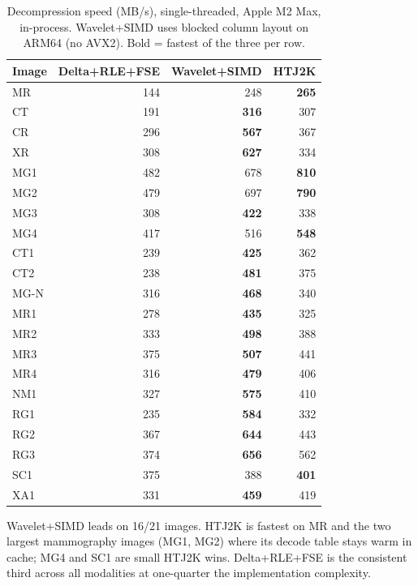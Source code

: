 \documentclass[10pt,twocolumn]{article}
\begin{document}
\begin{table}[h]
  \centering
  \caption{Decompression speed (MB/s), single-threaded, Apple M2 Max, in-process. Wavelet+SIMD uses blocked column layout on ARM64 (no AVX2). Bold = fastest of the three per row.}
  \label{tab:waveletspeed}
  \small
  \setlength{\tabcolsep}{4pt}
  \begin{tabular}{lrrr}
    \toprule
    Image & Delta+RLE+FSE & Wavelet+SIMD & HTJ2K \\
    \midrule
    MR   & 144 & 248 & \textbf{265} \\
    CT   & 191 & \textbf{316} & 307 \\
    CR   & 296 & \textbf{567} & 367 \\
    XR   & 308 & \textbf{627} & 334 \\
    MG1  & 482 & 678 & \textbf{810} \\
    MG2  & 479 & 697 & \textbf{790} \\
    MG3  & 308 & \textbf{422} & 338 \\
    MG4  & 417 & 516 & \textbf{548} \\
    CT1  & 239 & \textbf{425} & 362 \\
    CT2  & 238 & \textbf{481} & 375 \\
    MG-N & 316 & \textbf{468} & 340 \\
    MR1  & 278 & \textbf{435} & 325 \\
    MR2  & 333 & \textbf{498} & 388 \\
    MR3  & 375 & \textbf{507} & 441 \\
    MR4  & 316 & \textbf{479} & 406 \\
    NM1  & 327 & \textbf{575} & 410 \\
    RG1  & 235 & \textbf{584} & 332 \\
    RG2  & 367 & \textbf{644} & 443 \\
    RG3  & 374 & \textbf{656} & 562 \\
    SC1  & 375 & 388 & \textbf{401} \\
    XA1  & 331 & \textbf{459} & 419 \\
    \bottomrule
  \end{tabular}
\end{table}

Wavelet+SIMD leads on 16/21 images. HTJ2K is fastest on MR and the two largest mammography images (MG1, MG2) where its decode table stays warm in cache; MG4 and SC1 are small HTJ2K wins. Delta+RLE+FSE is the consistent third across all modalities at one-quarter the implementation complexity.
\end{document}
